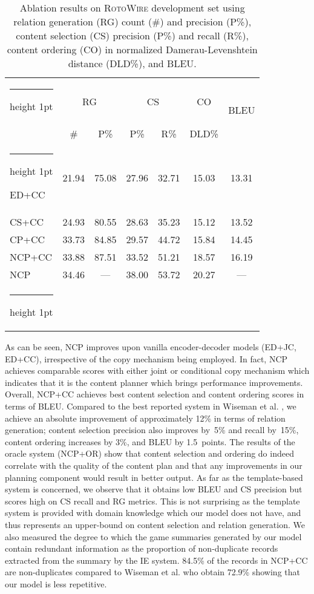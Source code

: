 \documentclass[letterpaper]{article} \usepackage{aaai19}  \usepackage{times}  \usepackage{helvet}  \usepackage{courier}  \usepackage{url}  \usepackage{graphicx}  \frenchspacing  \setlength{\pdfpagewidth}{8.5in}  \setlength{\pdfpageheight}{11in}  \graphicspath{ {images/} }
\makeatletter
\newcommand{\thickhline}{\noalign {\ifnum 0=`}\fi \hrule height 1pt
    \futurelet \reserved@a \@xhline
}
\makeatother
\begin{document}
\begin{table}[t]
\small
\centering
\begin{tabular}{ @{~}l@{~}|@{~}c@{~~}c|c@{~~}c|c|c@{~} } 
 \thickhline
\multirow{2}{*}{Model} &\multicolumn{2}{c|}{RG} &\multicolumn{2}{c|}{CS} & CO & \multirow{2}{*}{BLEU}\\ 

 &\# & P\% & P\% & R\% & DLD\% & \\ 
\thickhline
ED+CC & 21.94 & 75.08 &27.96 & 32.71 & 15.03 & 13.31 \\ CS+CC &24.93 &80.55 &28.63 &35.23 &15.12 &13.52 \\ CP+CC &33.73 &84.85 &29.57 &44.72 &15.84 &14.45 \\ NCP+CC &{33.88} & {87.51} & {33.52} & {51.21}
 &{18.57} & {16.19}\\ NCP & 34.46 & ---& 38.00 & 53.72 & 20.27& --- \\ 
\thickhline
\end{tabular}
\caption{\label{tbl:ablation-content-selection-planning}Ablation
  results on  \textsc{RotoWire} development set using 
  relation generation (RG)  count (\#) and precision (P\%), content
  selection (CS) precision (P\%) and recall (R\%), content ordering
  (CO) in normalized Damerau-Levenshtein distance (DLD\%),
  and BLEU.}
\end{table}




As can be seen, NCP improves upon vanilla encoder-decoder models
(ED+JC, ED+CC), irrespective of the copy mechanism being employed. In
fact, NCP achieves comparable scores with either joint or conditional
copy mechanism which indicates that it is the content planner which
brings performance improvements. Overall, NCP+CC achieves best content
selection and content ordering scores in terms of BLEU. Compared to
the best reported system in Wiseman et
al. , we achieve an absolute
improvement of approximately 12\% in terms of relation generation;
content selection precision also improves by~5\% and recall by~15\%,
content ordering increases by 3\%, and BLEU by 1.5~points. The results
of the oracle system (NCP+OR) show that content selection and ordering
do indeed correlate with the quality of the content plan and that any
improvements in our planning component would result in better
output. As far as the template-based system is concerned, we observe
that it obtains low BLEU and CS precision but scores high on CS recall
and RG metrics.  This is not surprising as the template system is
provided with domain knowledge which our model does not have, and thus
represents an upper-bound on content selection and relation
generation. We also measured the degree to which the game summaries
generated by our model contain redundant information as the proportion
of non-duplicate records extracted from the summary by the IE system.
84.5\% of the records in NCP+CC are non-duplicates compared to Wiseman
et al.   who obtain 72.9\% showing
that our model is less repetitive.
\end{document}
